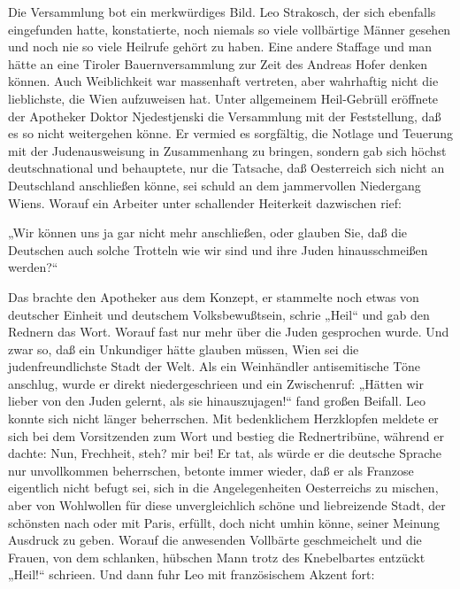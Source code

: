 Die Versammlung bot ein merkwürdiges Bild. Leo
Strakosch, der sich ebenfalls eingefunden hatte, konstatierte, noch
niemals so viele vollbärtige Männer gesehen und noch nie so viele
Heilrufe gehört zu haben. Eine andere Staffage und man hätte an
eine Tiroler Bauernversammlung zur Zeit des Andreas Hofer denken
können. Auch Weiblichkeit war massenhaft vertreten, aber wahrhaftig
nicht die lieblichste, die Wien aufzuweisen hat. Unter allgemeinem
Heil-Gebrüll eröffnete der Apotheker Doktor Njedestjenski die
Versammlung mit der Feststellung, daß es so nicht weitergehen
könne. Er vermied es sorgfältig, die Notlage und Teuerung mit der
Judenausweisung in Zusammenhang zu bringen, sondern gab sich höchst
deutschnational und behauptete, nur die Tatsache, daß Oesterreich
sich nicht an Deutschland anschließen könne, sei schuld an dem
jammervollen Niedergang Wiens. Worauf ein Arbeiter unter
schallender Heiterkeit dazwischen rief:

„Wir können uns ja gar nicht mehr anschließen, oder glauben Sie,
daß die Deutschen auch solche Trotteln wie wir sind und ihre Juden
hinausschmeißen werden?“

Das brachte den Apotheker aus dem Konzept, er stammelte noch etwas
von deutscher Einheit und deutschem Volksbewußtsein, schrie „Heil“
und gab den Rednern das Wort. Worauf fast nur mehr über die Juden
gesprochen wurde. Und zwar so, daß ein Unkundiger hätte glauben
müssen, Wien sei die judenfreundlichste Stadt der Welt. Als ein
Weinhändler antisemitische Töne anschlug, wurde er direkt
niedergeschrieen und ein Zwischenruf: „Hätten wir lieber von den
Juden gelernt, als sie hinauszujagen!“  fand großen
Beifall. Leo konnte sich nicht länger beherrschen. Mit bedenklichem
Herzklopfen meldete er sich bei dem Vorsitzenden zum Wort und
bestieg die Rednertribüne, während er dachte: Nun, Frechheit, steh?
mir bei! Er tat, als würde er die deutsche Sprache nur unvollkommen
beherrschen, betonte immer wieder, daß er als Franzose eigentlich
nicht befugt sei, sich in die Angelegenheiten Oesterreichs zu
mischen, aber von Wohlwollen für diese unvergleichlich schöne und
liebreizende Stadt, der schönsten nach oder mit Paris, erfüllt,
doch nicht umhin könne, seiner Meinung Ausdruck zu geben. Worauf
die anwesenden Vollbärte geschmeichelt und die Frauen, von dem
schlanken, hübschen Mann trotz des Knebelbartes entzückt „Heil!“
schrieen. Und dann fuhr Leo mit französischem Akzent fort:

